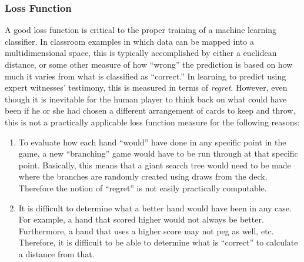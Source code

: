 
\subsubsection{Loss Function}


A good loss function is critical to the proper training of a machine learning
classifier.
%
In classroom examples in which data can be mapped into a multidimensional
space,
this is typically accomplished by either a euclidean distance, or some other
measure of how ``wrong'' the prediction is based on how much it varies from what
is classified as ``correct.''
%
In learning to predict using expert witnesses' testimony,
this is measured in terms of \textit{regret}.
%
However, even though it is inevitable for the human player to think back on what
could have been if he or she had chosen a different arrangement of cards to keep
and throw, this is not a practically applicable loss function measure for the
following reasons:
%
\begin{enumerate}
\item To evaluate how each hand ``would'' have done in any specific point in the
	game, a new ``branching'' game would have to be run through at that specific
	point. Basically, this means that a giant search tree would need to be made
	where the branches are randomly created using draws from the deck.
	Therefore the notion of ``regret'' is not easily practically computable.

\item It is difficult to determine what a better hand would have been in any
	case.
	For example, a hand that scored higher would not always be better.
	Furthermore, a hand that uses a higher score may not peg as well, etc.
	Therefore, it is difficult to be able to determine what is ``correct'' to
	calculate a distance from that.
\end{enumerate}
%

